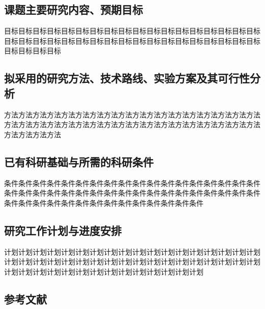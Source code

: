 \begin{SecBox}
\section{课题主要研究内容、预期目标}

目标目标目标目标目标目标目标目标目标目标目标目标目标目标目标目标目标目标目标目标目标目标目标目标目标目标目标目标目标目标目标目标目标目标目标目标目标目标目标目标

    
\end{SecBox}
\begin{SecBox}
\section{拟采用的研究方法、技术路线、实验方案及其可行性分析}

方法方法方法方法方法方法方法方法方法方法方法方法方法方法方法方法方法方法方法方法方法方法方法方法方法方法方法方法方法方法方法方法方法方法方法方法方法方法方法方法

    
\end{SecBox}
\begin{SecBox}
\section{已有科研基础与所需的科研条件}

条件条件条件条件条件条件条件条件条件条件条件条件条件条件条件条件条件条件条件条件条件条件条件条件条件条件条件条件条件条件条件条件条件条件条件条件条件条件条件条件条件条件条件条件条件条件条件条件条件条件

    
\end{SecBox}
\begin{SecBox}
\section{研究工作计划与进度安排}

计划计划计划计划计划计划计划计划计划计划计划计划计划计划计划计划计划计划计划计划计划计划计划计划计划计划计划计划计划计划计划计划计划计划计划计划计划计划计划计划计划计划计划计划计划计划计划计划计划计划

    
\end{SecBox}

\begin{SecBox}
\section{参考文献}
\nocite{*}%
\end{SecBox}

